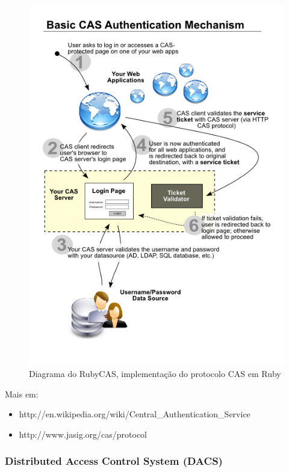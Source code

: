 \documentclass[11pt]{article}
\begin{document}
\begin{figure}[h]
\center
\includegraphics[scale=0.4]{sso-rubycas.png}
\caption{Diagrama do RubyCAS, implementação do protocolo CAS em Ruby}
\label{fig:sso-rubycas}
\end{figure}


Mais em:
\begin{itemize}
  \item{http://en.wikipedia.org/wiki/Central\_Authentication\_Service}
  \item{http://www.jasig.org/cas/protocol}
\end{itemize}

\subsubsection{Distributed Access Control System (DACS)}
\end{document}

